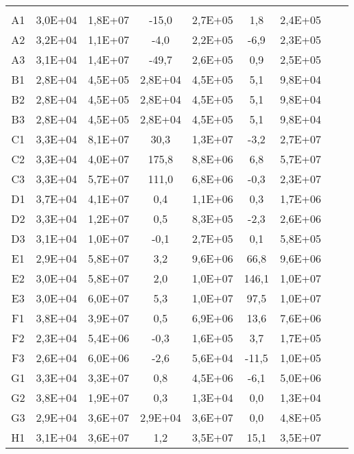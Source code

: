 \begin{center}
\begin{longtable}{ccccccccc}
\toprule
\endhead
\midrule \\ %
\endfoot
\bottomrule 
\endlastfoot
    A1    & 3,0E+04 & 1,8E+07 & -15,0 & 2,7E+05 & 1,8   & 2,4E+05 \\
    A2    & 3,2E+04 & 1,1E+07 & -4,0  & 2,2E+05 & -6,9  & 2,3E+05 \\
    A3    & 3,1E+04 & 1,4E+07 & -49,7 & 2,6E+05 & 0,9   & 2,5E+05 \\
    B1    & 2,8E+04 & 4,5E+05 & 2,8E+04 & 4,5E+05 & 5,1   & 9,8E+04 \\
    B2    & 2,8E+04 & 4,5E+05 & 2,8E+04 & 4,5E+05 & 5,1   & 9,8E+04 \\
    B3    & 2,8E+04 & 4,5E+05 & 2,8E+04 & 4,5E+05 & 5,1   & 9,8E+04 \\
    C1    & 3,3E+04 & 8,1E+07 & 30,3  & 1,3E+07 & -3,2  & 2,7E+07 \\
    C2    & 3,3E+04 & 4,0E+07 & 175,8 & 8,8E+06 & 6,8   & 5,7E+07 \\
    C3    & 3,3E+04 & 5,7E+07 & 111,0 & 6,8E+06 & -0,3  & 2,3E+07 \\
    D1    & 3,7E+04 & 4,1E+07 & 0,4   & 1,1E+06 & 0,3   & 1,7E+06 \\
    D2    & 3,3E+04 & 1,2E+07 & 0,5   & 8,3E+05 & -2,3  & 2,6E+06 \\
    D3    & 3,1E+04 & 1,0E+07 & -0,1  & 2,7E+05 & 0,1   & 5,8E+05 \\
    E1    & 2,9E+04 & 5,8E+07 & 3,2   & 9,6E+06 & 66,8  & 9,6E+06 \\
    E2    & 3,0E+04 & 5,8E+07 & 2,0   & 1,0E+07 & 146,1 & 1,0E+07 \\
    E3    & 3,0E+04 & 6,0E+07 & 5,3   & 1,0E+07 & 97,5  & 1,0E+07 \\
    F1    & 3,8E+04 & 3,9E+07 & 0,5   & 6,9E+06 & 13,6  & 7,6E+06 \\
    F2    & 2,3E+04 & 5,4E+06 & -0,3  & 1,6E+05 & 3,7   & 1,7E+05 \\
    F3    & 2,6E+04 & 6,0E+06 & -2,6  & 5,6E+04 & -11,5 & 1,0E+05 \\
    G1    & 3,3E+04 & 3,3E+07 & 0,8   & 4,5E+06 & -6,1  & 5,0E+06 \\
    G2    & 3,8E+04 & 1,9E+07 & 0,3   & 1,3E+04 & 0,0   & 1,3E+04 \\
    G3    & 2,9E+04 & 3,6E+07 & 2,9E+04 & 3,6E+07 & 0,0   & 4,8E+05 \\
    H1    & 3,1E+04 & 3,6E+07 & 1,2   & 3,5E+07 & 15,1  & 3,5E+07 \\

\end{longtable}
\end{center}
